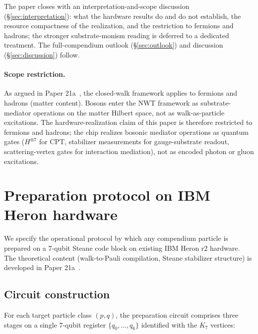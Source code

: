 \documentclass[11pt]{article}
\begin{document}
The paper closes with an interpretation-and-scope discussion (\S\ref{sec:interpretation}): what the hardware results do and do not establish, the resource compactness of the realization, and the restriction to fermions and hadrons; the stronger substrate-monism reading is deferred to a dedicated treatment.  The full-compendium outlook (\S\ref{sec:outlook}) and discussion (\S\ref{sec:discussion}) follow.

\paragraph{Scope restriction.}
As argued in Paper 21a~\cite[\S 3.6]{Paper21a}, the closed-walk framework applies to fermions and hadrons (matter content).  Bosons enter the NWT framework as substrate-mediator operations on the matter Hilbert space, not as walk-as-particle excitations.  The hardware-realization claim of this paper is therefore restricted to fermions and hadrons; the chip realizes bosonic mediator operations as quantum gates ($H^{\otimes 7}$ for CPT, stabilizer measurements for gauge-substrate readout, scattering-vertex gates for interaction mediation), not as encoded photon or gluon excitations.

\section{Preparation protocol on IBM Heron hardware}
\label{sec:protocol}

We specify the operational protocol by which any compendium particle is prepared on a $7$-qubit Steane code block on existing IBM Heron r2 hardware.  The theoretical content (walk-to-Pauli compilation, Steane stabilizer structure) is developed in Paper 21a~\cite[\S 4, \S 5]{Paper21a}.

\subsection{Circuit construction}
\label{sec:circuit-construction}

For each target particle class $(p, q)$, the preparation circuit comprises three stages on a single $7$-qubit register $\{q_0, \ldots, q_6\}$ identified with the $K_7$ vertices:
\end{document}
